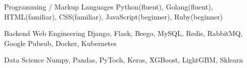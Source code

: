 

\begin{cvskills}


  \cvskill
    {Programming / Markup Languages} %
    {Python(fluent), Golang(fluent), HTML(familiar), CSS(familiar), JavaScript(beginner), Ruby(beginner)} %

  \cvskill
    {Backend Web Engineering} %
    {Django, Flask, Beego, MySQL, Redis, RabbitMQ, Google Pubsub, Docker, Kubernetes} %

  \cvskill
    {Data Science}
    {Numpy, Pandas, PyToch, Keras, XGBoost, LightGBM, Sklearn}



\end{cvskills}
